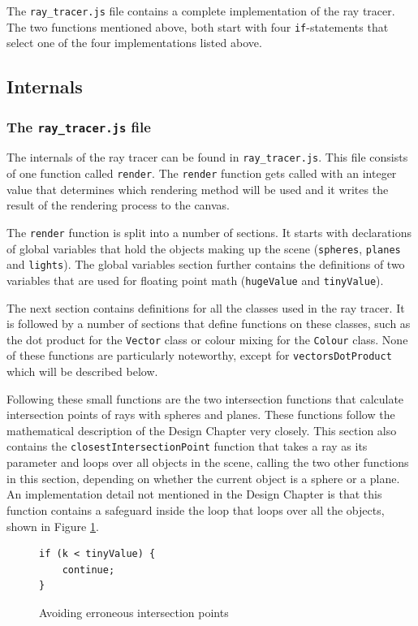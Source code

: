 \documentclass[11pt]{report}
\begin{document}
The \texttt{ray_tracer.js} file contains a complete implementation of the ray tracer. The two functions mentioned above, both start with four \texttt{if}-statements that select one of the four implementations listed above. 

\subsection{Internals}
\subsubsection{The \texttt{ray_tracer.js} file}
The internals of the ray tracer can be found in \texttt{ray_tracer.js}. This file consists of one function called \texttt{render}. The \texttt{render} function gets called with an integer value that determines which rendering method will be used and it writes the result of the rendering process to the canvas.

The \texttt{render} function is split into a number of sections. It starts with declarations of global variables that hold the objects making up the scene (\texttt{spheres}, \texttt{planes} and \texttt{lights}). The global variables section further contains the definitions of two variables that are used for floating point math (\texttt{hugeValue} and \texttt{tinyValue}). 

The next section contains definitions for all the classes used in the ray tracer. It is followed by a number of sections that define functions on these classes, such as the dot product for the \texttt{Vector} class or colour mixing for the \texttt{Colour} class. None of these functions are particularly noteworthy, except for \texttt{vectorsDotProduct} which will be described below.

Following these small functions are the two intersection functions that calculate intersection points of rays with spheres and planes. These functions follow the mathematical description of the Design Chapter very closely. This section also contains the \texttt{closestIntersectionPoint} function that takes a ray as its parameter and loops over all objects in the scene, calling the two other functions in this section, depending on whether the current object is a sphere or a plane. An implementation detail not mentioned in the Design Chapter is that this function contains a safeguard inside the loop that loops over all the objects, shown in Figure \ref{irenderer1}.

\begin{figure}[ht]
\begin{lstlisting}
if (k < tinyValue) {
    continue;
}
\end{lstlisting}
\caption{Avoiding erroneous intersection points}
\label{irenderer1}
\end{figure}
\end{document}
